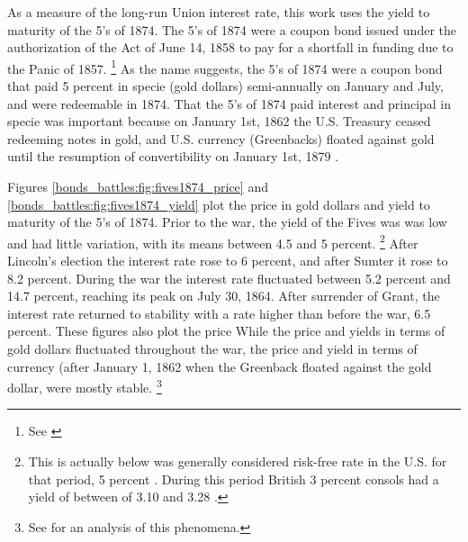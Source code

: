 As a measure of the long-run Union interest rate, this work uses the yield to maturity of the 5's of 1874.
The 5's of 1874 were a coupon bond issued under the authorization of the Act of June 14, 1858 to pay for a shortfall in funding due to the Panic of 1857.%
\footnote{See \textcites[p. 76]{Bayley1882}[78--79]{DeKnight1900}[42-43]{Treasury1863}[300-301, 305]{HomerSylla2005}}
As the name suggests, the 5's of 1874 were a coupon bond that paid 5 percent in specie (gold dollars) semi-annually on January and July, and were redeemable in 1874.
That the 5's of 1874 paid interest and principal in specie was important because on January 1st, 1862 the U.S. Treasury ceased redeeming notes in gold, and U.S. currency (Greenbacks) floated against gold until the resumption of convertibility on January 1st, 1879 \parencites{Dewey1918}{WillardGuinnaneEtAl1996}.

Figures \ref{bonds_battles:fig:fives1874_price} and \ref{bonds_battles:fig:fives1874_yield} plot the price in gold dollars and yield to maturity of the 5's of 1874.
Prior to the war, the yield of the Fives was was low and had little variation, with its means between 4.5 and 5 percent.%
\footnote{
  This is actually below was generally considered risk-free rate in the U.S. for that period, 5 percent \parencite[][calls it the ``natural rate'']{Elder1863}.
  During this period British 3 percent consols had a yield of between of 3.10 and 3.28 \parencite[193]{HomerSylla2005}.
}
After Lincoln's election the interest rate rose to 6 percent, and after Sumter it rose to 8.2 percent.
During the war the interest rate fluctuated between 5.2 percent and 14.7 percent, reaching its peak on July 30, 1864.
After surrender of Grant, the interest rate returned to stability with a rate higher than before the war, 6.5 percent.
These figures also plot the price
While the price and yields in terms of gold dollars fluctuated throughout the war, the price and yield in terms of currency (after January 1, 1862 when the Greenback floated against the gold dollar, were mostly stable.%
\footnote{See \textcite{Roll1972} for an analysis of this phenomena.}

